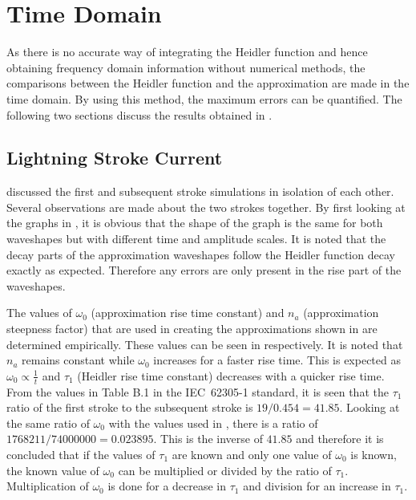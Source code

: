 
\section{Time Domain}
\label{sec:discussion_time_domain}
As there is no accurate way of integrating the Heidler function and hence obtaining frequency domain information without numerical methods, the comparisons between the Heidler function and the approximation are made in the time domain. By using this method, the maximum errors can be quantified. The following two sections discuss the results obtained in .

\subsection{Lightning Stroke Current}
\label{sub:discussion_lightning_stroke_current}
 discussed the first and subsequent stroke simulations in isolation of each other. Several observations are made about the two strokes together. By first looking at the graphs in , it is obvious that the shape of the graph is the same for both waveshapes but with different time and amplitude scales. It is noted that the decay parts of the approximation waveshapes follow the Heidler function decay exactly as expected. Therefore any errors are only present in the rise part of the waveshapes.

The values of $\omega_0$ (approximation rise time constant) and $n_a$ (approximation steepness factor) that are used in creating the approximations shown in  are determined empirically. These values can be seen in  respectively. It is noted that $n_a$ remains constant while $\omega_0$ increases for a faster rise time. This is expected as $\omega_0 \propto \frac{1}{t}$ and $\tau_1$ (Heidler rise time constant) decreases with a quicker rise time. From the values in Table B.1 in the IEC~62305-1 standard, it is seen that the $\tau_1$ ratio of the first stroke to the subsequent stroke is $19/0.454 = 41.85$. Looking at the same ratio of $\omega_0$ with the values used in , there is a ratio of $1 768 211/74 000 000 = 0.023895$. This is the inverse of $41.85$ and therefore it is concluded that if the values of $\tau_1$ are known and only one value of $\omega_0$ is known, the known value of $\omega_0$ can be multiplied or divided by the ratio of $\tau_1$. Multiplication of $\omega_0$ is done for a decrease in $\tau_1$ and division for an increase in $\tau_1$.


